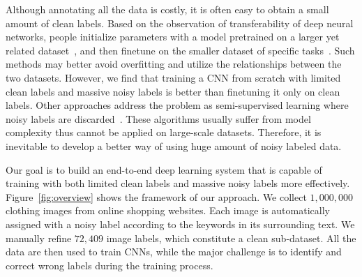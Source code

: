 \documentclass[10pt,twocolumn,letterpaper]{article}
\begin{document}
Although annotating all the data is costly, it is often easy to obtain a small amount of clean labels. Based on the observation of transferability of deep neural networks, people initialize parameters with a model pretrained on a larger yet related dataset~\cite{krizhevsky2012imagenet}, and then finetune on the smaller dataset of specific tasks~\cite{oquab2014learning,azizpour2014generic,donahue2013decaf}. Such methods may better avoid overfitting and utilize the relationships between the two datasets. However, we find that training a CNN from scratch with limited clean labels and massive noisy labels is better than finetuning it only on clean labels. Other approaches address the problem as semi-supervised learning where noisy labels are discarded~\cite{zhu2002learning}. These algorithms usually suffer from model complexity thus cannot be applied on large-scale datasets. Therefore, it is inevitable to develop a better way of using huge amount of noisy labeled data.

Our goal is to build an end-to-end deep learning system that is capable of training with both limited clean labels and massive noisy labels more effectively. Figure~\ref{fig:overview} shows the framework of our approach. We collect $1,000,000$ clothing images from online shopping websites. Each image is automatically assigned with a noisy label according to the keywords in its surrounding text. We manually refine $72,409$ image labels, which constitute a clean sub-dataset. All the data are then used to train CNNs, while the major challenge is to identify and correct wrong labels during the training process.
\end{document}
